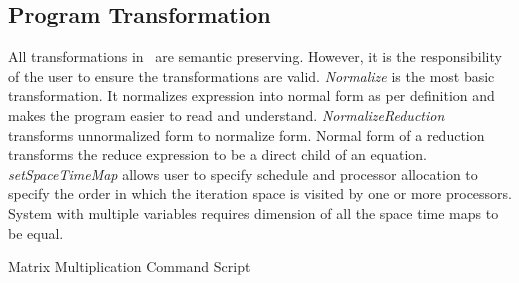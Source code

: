 \subsection{Program Transformation}
All transformations in \alphaz\ are semantic preserving. However, it is the responsibility of the user to ensure the transformations are valid. \textit{Normalize} is the most basic transformation. It normalizes expression into normal form as per definition and makes the program easier to read and understand. \textit{NormalizeReduction} transforms unnormalized form to normalize form. Normal form of a reduction transforms the reduce expression to be a direct child of an equation.  \textit{setSpaceTimeMap} allows user to specify schedule and processor allocation to specify the order in which the iteration space is visited by one or more processors. System with multiple variables requires dimension of all the space time maps to be equal.
 \begin{algorithm}
 \caption{Matrix Multiplication Command Script}
 \begin{algorithmic} [1]
 \STATE {}
 \STATE {}
 \STATE {}
 \STATE {}

 \STATE \text{}
 \STATE {}
 \STATE {}
 \STATE {}
 \STATE {}
 \STATE {}
 \STATE {}
 \STATE \text{}
 \STATE {}
 \STATE {}
\STATE {}
\end{algorithmic}
\label{algo:matrix_mul_script}
\end{algorithm}

